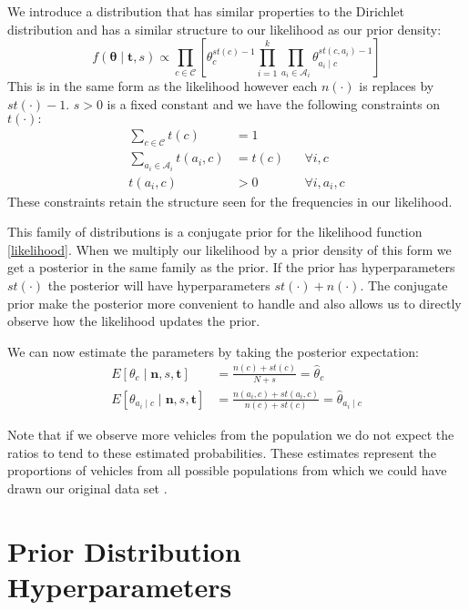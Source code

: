 We introduce a distribution that has similar properties to the Dirichlet distribution and has a similar structure to our likelihood as our prior density:
\begin{equation} \label{prior}
	f(\bm{\theta} \mid \mathbf{t}, s) \propto \prod_{c \in \mathcal{C}} \left[ \theta_c^{st(c) - 1} \prod_{i=1}^k \prod_{a_i \in \mathcal{A}_i} \theta_{a_i \mid c}^{st(c, a_i) - 1} \right]
\end{equation}
This is in the same form as the likelihood however each $n(\cdot)$ is replaces by $st(\cdot) - 1$.
$s > 0$ is a fixed constant and we have the following constraints on $t(\cdot):$
\begin{align}\label{prior_constraints}
	\sum_{c \in \mathcal{C}} t(c) & = 1 \\
	\sum_{a_i \in \mathcal{A}_i} t(a_i, c) & = t(c) && \forall i, c \\
	t(a_i, c) & > 0 && \forall i, a_i, c
\end{align}
These constraints retain the structure seen for the frequencies in our likelihood.

This family of distributions is a conjugate prior for the likelihood function \cref{likelihood}.
When we multiply our likelihood by a prior density of this form we get a posterior in the same family as the prior.
If the prior has hyperparameters $st(\cdot)$ the posterior will have hyperparameters $st(\cdot) + n(\cdot)$.
The conjugate prior make the posterior more convenient to handle and also allows us to directly observe how the likelihood updates the prior.

We can now estimate the parameters by taking the posterior expectation:
\begin{align}
	E[\theta_c \mid \mathbf{n},s,\mathbf{t}] & = \frac{n(c) + st(c)}{N + s} = \hat{\theta}_c \\
	E[\theta_{a_i \mid c} \mid \mathbf{n},s,\mathbf{t}] & = \frac{n(a_i, c) + st(a_i, c)}{n(c) + st(c)} = \hat{\theta}_{a_i \mid c}
\end{align}

Note that if we observe more vehicles from the population we do not expect the ratios to tend to these estimated probabilities.
These estimates represent the proportions of vehicles from all possible populations from which we could have drawn our original data set \cite{Lidstone20}.

\section{Prior Distribution Hyperparameters}

